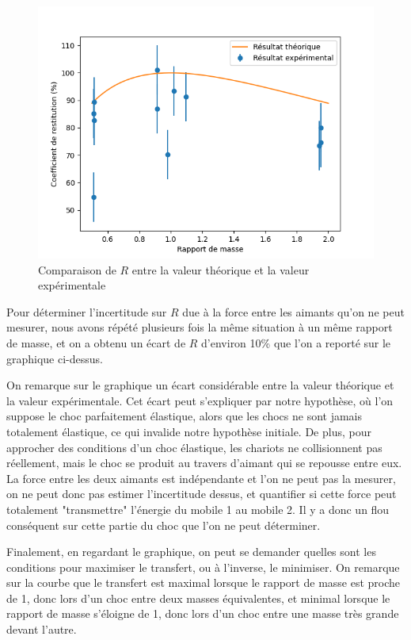 \documentclass[12pt]{article}
\begin{document}
\begin{figure}[h!]
    \begin{center}
        \includegraphics[scale=0.8]{RapportMasse.png}
    \end{center}
    \caption{Comparaison de $R$ entre la valeur théorique et la valeur expérimentale}
\end{figure}

Pour déterminer l'incertitude sur $R$ due à la force entre les aimants qu'on ne peut mesurer, nous avons répété plusieurs fois la même situation à un même rapport de masse, 
et on a obtenu un écart de $R$ d'environ 10\% que l'on a reporté sur le graphique ci-dessus.

On remarque sur le graphique un écart considérable entre la valeur théorique et la valeur expérimentale. Cet écart peut s'expliquer par notre hypothèse, où l'on suppose le choc parfaitement élastique, alors
que les chocs ne sont jamais totalement élastique, ce qui invalide notre hypothèse initiale. De plus, pour approcher des conditions d'un choc élastique, les chariots ne collisionnent pas réellement, mais le choc se produit
au travers d'aimant qui se repousse entre eux. La force entre les deux aimants est indépendante et l'on ne peut pas la mesurer, on ne peut donc pas estimer l'incertitude dessus, et quantifier si cette force 
peut totalement "transmettre" l'énergie du mobile 1 au mobile 2. Il y a donc un flou conséquent sur cette partie du choc que l'on ne peut déterminer.

Finalement, en regardant le graphique, on peut se demander quelles sont les conditions pour maximiser le transfert, ou à l'inverse, le minimiser. On remarque sur la courbe que le transfert est maximal lorsque
le rapport de masse est proche de 1, donc lors d'un choc entre deux masses équivalentes, et minimal lorsque le rapport de masse s'éloigne de 1, donc lors d'un choc entre une masse très grande devant l'autre.
\end{document}
